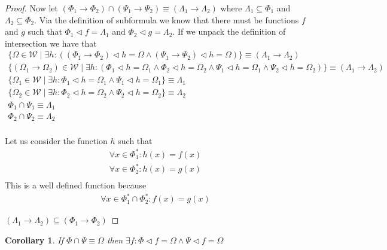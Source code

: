 \documentclass{article}
\newtheorem*{cor}{Corollary}
\begin{document}
\begin{proof}
Now let $(\Phi_1 \rightarrow \Phi_2) \cap (\Psi_1 \rightarrow \Psi_2) \equiv (\Lambda_1 \rightarrow \Lambda_2)$ where $\Lambda_1 \subseteq \Phi_1$ and $\Lambda_2 \subseteq \Phi_2$.
Via the definition of subformula we know that there must be functions $f$ and $g$ such that $\Phi_1 \lhd f = \Lambda_1$ and $\Phi_2 \lhd g = \Lambda_2$.
If we unpack the definition of intersection we have that
\begin{align*}
\{\Omega \in \mathcal{W} \mid \exists h : ((\Phi_1 \rightarrow \Phi_2) \lhd h = \Omega \land (\Psi_1 \rightarrow \Psi_2) \lhd h = \Omega)\} \equiv (\Lambda_1 \rightarrow \Lambda_2) \\
\{(\Omega_1 \rightarrow \Omega_2) \in \mathcal{W} \mid \exists h : (\Phi_1 \lhd h = \Omega_1 \land \Phi_2 \lhd h = \Omega_2 \land \Psi_1 \lhd h = \Omega_1 \land \Psi_2 \lhd h = \Omega_2)\} \equiv (\Lambda_1 \rightarrow \Lambda_2) \\
\{\Omega_1 \in \mathcal{W} \mid \exists h : \Phi_1 \lhd h = \Omega_1 \land \Psi_1 \lhd h = \Omega_1 \} \equiv \Lambda_1 \\
\{\Omega_2 \in \mathcal{W} \mid \exists h : \Phi_2 \lhd h = \Omega_2 \land \Psi_2 \lhd h = \Omega_2 \} \equiv \Lambda_2 \\
\Phi_1 \cap \Psi_1 \equiv \Lambda_1 \\
\Phi_2 \cap \Psi_2 \equiv \Lambda_2 \\
\end{align*}

Let us consider the function $h$ such that
\begin{align*}
\forall x \in \Phi_1^* : h(x) = f(x) \\
\forall x \in \Phi_2^* : h(x) = g(x) \\
\end{align*}
This is a well defined function because
\begin{align*}
\forall x \in \Phi_1^*\cap\Phi_2^* : f(x) = g(x)
\end{align*}

$(\Lambda_1 \rightarrow \Lambda_2) \subseteq (\Phi_1 \rightarrow \Phi_2)$
\end{proof}
\begin{cor}
If $\Phi \cap \Psi \equiv \Omega$ then $\exists f: \Phi \lhd f = \Omega \land \Psi \lhd f = \Omega$
\end{cor}
\end{document}
